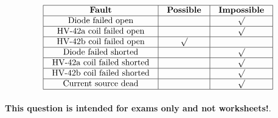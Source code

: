 

$$\vbox{\offinterlineskip
\halign{\strut
\vrule \quad\hfil # \ \hfil & 
\vrule \quad\hfil # \ \hfil & 
\vrule \quad\hfil # \ \hfil \vrule \cr
\noalign{\hrule}
%
{\bf Fault} & {\bf Possible} & {\bf Impossible} \cr
%
\noalign{\hrule}
%
Diode failed open &  & $\surd$ \cr
%
\noalign{\hrule}
%
HV-42a coil failed open &  & $\surd$ \cr
%
\noalign{\hrule}
%
HV-42b coil failed open & $\surd$ &  \cr
%
\noalign{\hrule}
%
Diode failed shorted &  & $\surd$ \cr
%
\noalign{\hrule}
%
HV-42a coil failed shorted &  & $\surd$ \cr
%
\noalign{\hrule}
%
HV-42b coil failed shorted &  & $\surd$ \cr
%
\noalign{\hrule}
%
Current source dead &  & $\surd$ \cr
%
\noalign{\hrule}
} %
}$$ %







{\bf This question is intended for exams only and not worksheets!}.



